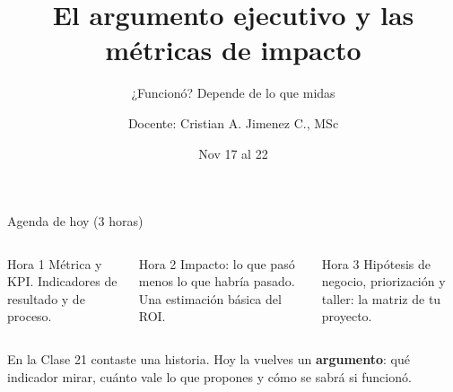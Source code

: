 \documentclass[aspectratio=169,11pt]{beamer}
\title{El argumento ejecutivo y las métricas de impacto}
\subtitle{¿Funcionó? Depende de lo que midas}
\author{Docente: Cristian A. Jimenez C., MSc}
\date{Nov 17 al 22}
\begin{document}
{
\begin{frame}
  \titlepage
\end{frame}
}

\begin{frame}[t]{Agenda de hoy (3 horas)}
  \begin{columns}[T,onlytextwidth]
    \begin{block}{Hora 1}
      \small Métrica y KPI. Indicadores de resultado y de proceso.
    \end{block}
    \begin{block}{Hora 2}
      \small Impacto: lo que pasó menos lo que habría pasado. Una
      estimación básica del ROI.
    \end{block}
    \begin{block}{Hora 3}
      \small Hipótesis de negocio, priorización y taller: la matriz de tu
      proyecto.
    \end{block}
  \end{columns}
  \vspace{0.3cm}
  \small En la Clase 21 contaste una historia. Hoy la vuelves un
  \textbf{argumento}: qué indicador mirar, cuánto vale lo que propones y
  cómo se sabrá si funcionó.
\end{frame}

\end{document}

